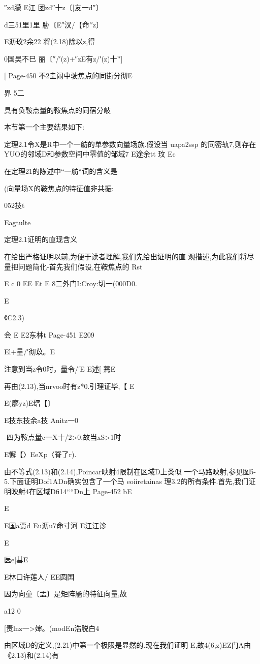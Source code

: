 {{{{{{{″zd朦
E江
团zd″十z〔]友一d″〕

d三51里1里
胁〔E″汊/【命'′z〕

E沥玟2余22
将(2.18)除以z,得

0国吴不巳
丽〔″/′(z)+″zE有z/′(z)十'′]

[
Page-450
不2圭闹中驶焦点的同街分彻E

界
5二

具有负鞍点量的鞍焦点的同宿分岐

本节第一个主要结果如下:

定理2.1令X是R中一个一舫的单参数向量场族.假设当
uapa2ssp
的同密轨7,则存在YUO的邻域D和参数空间中零值的邹域7
E途余tt
玟
Ec

在定理21的陈述中“一舫“词的含义是

(向量场X的鞍焦点的特征值非共振:

052技t

Eagtulte

定理2.1证明的直现含义

在给出严格证明以前,为便于读者理解,我们先给出证明的直
观揩述,为此我们将尽量把问题简化-首先我们假设,在鞍焦点的
Rst

E
c
0
EE
Et
E
8二外门I:Croy:切一(000D0.

E

《C2.3)

会
E
E2东林t
Page-451
E209

El+量/′彻苡。E

注意到当z令0时，量令/′E
E述[
蔫E

再由(2.13),当nrvoo时有z*0.引理证毕,【
E

E{(廖yz)E缙【〕}

E技东技余a技
Anitz一0}-四为鞍点量c一X十/2>0,故当xS>1时

E懈【〉EeXp〈脊了r).

由不等式(2.13)和(2.14),Poincar映射4限制在区域D上类似
一个马路映射,参见图5-5.下面证明Dof1ADn确实包含了一个马
eoiiretainas
理3.2的所有条件.首先,我们证明映射4在区域Dfi14““Dn上
Page-452
bE

E

E国a贾d
Eu沥u7命寸河
E江江诊

E

医e[彗E

E林口许莲人/
EE圆国

因为向童〔盂〕是矩阵靥的特征向量,故

a12
0

[责lnz一>婶。(modEn浩脱白4

由区域D的定义,(2.21)中第一个极限是显然的.现在我们证明
E,故4(6,z)EZ门A由
《2.13)和(2.14)有

}}}}}}
